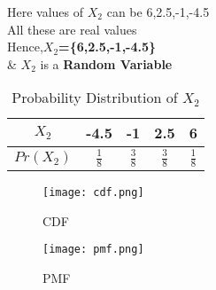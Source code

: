 \documentclass[11pt,a4paper,twocolumn]{article}
\begin{document}
Here values of $X_{2}$ can be 6,2.5,-1,-4.5\\
All these are real values\\
Hence,\textbf{$X_{2}$=\{6,2.5,-1,-4.5\}}\\
\& $X_2$ is a \textbf{Random Variable}
\begin{table}[h!]
    \centering
    \begin{tabular}{|c|c|c|c|c|}
    \hline
         $X_{2}$&-4.5&-1&2.5&6  \\
         \hline
         $Pr(X_{2})$&$\frac{1}{8}$&$\frac{3}{8}$&$\frac{3}{8}$&$\frac{1}{8}$\\
         \hline
    \end{tabular}
    \caption{Probability Distribution of $X_{2}$}
    \label{tab:my_label}
\end{table}
\newpage
\begin{figure}[h!]
    \centering
    \texttt{[image: cdf.png]}
    \caption{CDF}
    \label{fig:my_label}
\end{figure}
\begin{figure}[h!]
    \centering
    \texttt{[image: pmf.png]}
    \caption{PMF}
    \label{fig:my_label}
\end{figure}
\end{document}
